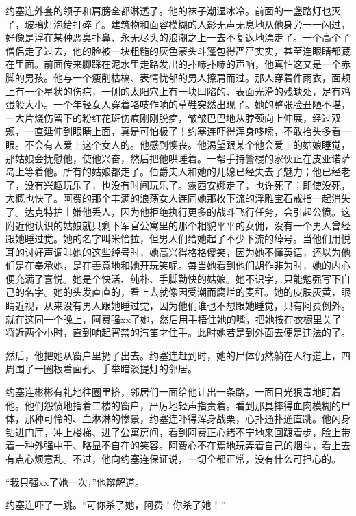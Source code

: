     约塞连外套的领子和肩膀全都淋透了。他的袜子潮湿冰冷。前面的一盏路灯也灭了，玻璃灯泡给打碎了。建筑物和面容模糊的人影无声无息地从他身旁一一闪过，好像是浮在某种恶臭扑鼻、永无尽头的浪潮之上一去不复返地漂走了。一个高个子僧侣走了过去，他的脸被一块粗糙的灰色蒙头斗篷包得严严实实，甚至连眼睛都藏在里面。前面传来脚踩在泥水里走路发出的扑哧扑哧的声响，他真怕这又是一个赤脚的男孩。他与一个瘦削枯槁、表情忧郁的男人擦肩而过。那人穿着件雨衣，面颊上有一个星状的伤疤，一侧的太阳穴上有一块凹陷的、表面光滑的残缺处，足有鸡蛋般大小。一个年轻女人穿着咯吱作响的草鞋突然出现了。她的整张脸丑陋不堪，一大片烧伤留下的粉红花斑伤痕刚刚脱痴，皱皱巴巴地从脖颈向上伸展，经过双颊，一直延伸到眼睛上面，真是可怕极了！约塞连吓得浑身哆嗦，不敢抬头多看一眼。不会有人爱上这个女人的。他感到懊丧。他渴望跟某个他会爱上的姑娘睡觉，那姑娘会抚慰他，使他兴奋，然后把他哄睡着。一帮手持警棍的家伙正在皮亚诺萨岛上等着他。所有的姑娘都走了。伯爵夫人和她的儿媳已经失去了魅力；他已经老了，没有兴趣玩乐了，也没有时间玩乐了。露西安娜走了，也许死了；即使没死，大概也快了。阿费的那个丰满的浪荡女人连同她那枚下流的浮雕宝石戒指一起消失了。达克特护士嫌他丢人，因为他拒绝执行更多的战斗飞行任务，会引起公愤。这附近他认识的姑娘就只剩下军官公寓里的那个相貌平平的女佣，没有一个男人曾经跟她睡过觉。她的名字叫米恰拉，但男人们给她起了不少下流的绰号。当他们用悦耳的讨好声调叫她的这些绰号时，她高兴得格格傻笑，因为她不懂英语，还以为他们是在奉承她，是在善意地和她开玩笑呢。每当她看到他们胡作非为时，她的内心便充满了喜悦。她是个快活、纯朴、手脚勤快的姑娘。她不识字，只能勉强写下自己的名字。她的头发直直的，看上去就像因受潮而腐烂的麦秆。她的皮肤灰黄，眼睛近视，从来没有男人跟她睡过觉，因为他们谁也不想跟她睡觉，只有阿费例外。就在这同一个晚上，阿费强xx了她，然后用手捂住她的嘴，把她按在衣橱里关了将近两个小时，直到响起宵禁的汽笛才住手。此时她若是到外面去便是违法的了。

    然后，他把她从窗户里扔了出去。约塞连赶到时，她的尸体仍然躺在人行道上，四周围了一圈板着面孔、手举暗淡提灯的邻居。

    约塞连彬彬有礼地往圈里挤，邻居们一面给他让出一条路，一面目光狠毒地盯着他。他们怨愤地指着二楼的窗户，严厉地轻声指责着。看到那具摔得血肉模糊的尸体，那种可怜的、血淋淋的惨景，约塞连吓得浑身战栗，心扑通扑通直跳。他闪身钻进门厅，冲上楼梯、进了公寓房间，看到阿费正心绪不宁地来回踱着步，脸上带着一种外强中干、略显不自在的笑容。阿费心不在焉地玩弄着自己的烟斗，看上去有点心烦意乱。不过，他向约塞连保证说，一切全都正常，没有什么可担心的。

    “我只强xx了她一次，”他辩解道。

    约塞连吓了一跳。“可你杀了她，阿费！你杀了她！”

